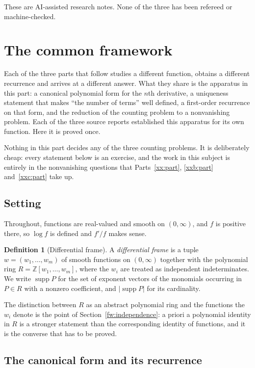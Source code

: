 \documentclass[11pt,a4paper]{article}
\numberwithin{equation}{section}
\theoremstyle{definition}
\newtheorem{definition}[theorem]{Definition}
\theoremstyle{remark}
\theoremstyle{plain}
\DeclareMathOperator{\supp}{supp}
\newcommand{\Z}{\mathbb Z}
\begin{document}
These are AI-assisted research notes.  None of the three has been refereed or
machine-checked.

\section{The common framework}\label{fw:sec}

Each of the three parts that follow studies a different function, obtains a
different recurrence and arrives at a different answer.  What they share is the
apparatus in this part: a canonical polynomial form for the $n$th derivative, a
uniqueness statement that makes ``the number of terms'' well defined, a
first-order recurrence on that form, and the reduction of the counting problem
to a nonvanishing problem.  Each of the three source reports established this
apparatus for its own function.  Here it is proved once.

Nothing in this part decides any of the three counting problems.  It is
deliberately cheap: every statement below is an exercise, and the work in this
subject is entirely in the nonvanishing questions that Parts~\ref{xx:part},
\ref{xxb:part} and~\ref{xxc:part} take up.

\subsection{Setting}\label{fw:setting}

Throughout, functions are real-valued and smooth on $(0,\infty)$, and $f$ is
positive there, so $\log f$ is defined and $f'/f$ makes sense.

\begin{definition}[Differential frame]\label{fw:def:frame}
A \emph{differential frame} is a tuple $w=(w_1,\dots,w_m)$ of smooth functions
on $(0,\infty)$ together with the polynomial ring $R=\Z[w_1,\dots,w_m]$, where
the $w_i$ are treated as independent indeterminates.  We write $\supp P$ for the
set of exponent vectors of the monomials occurring in $P\in R$ with a nonzero
coefficient, and $|\supp P|$ for its cardinality.
\end{definition}

The distinction between $R$ as an abstract polynomial ring and the functions the
$w_i$ denote is the point of Section~\ref{fw:independence}: a priori a
polynomial identity in $R$ is a stronger statement than the corresponding
identity of functions, and it is the converse that has to be proved.

\subsection{The canonical form and its recurrence}\label{fw:canonical}
\end{document}
